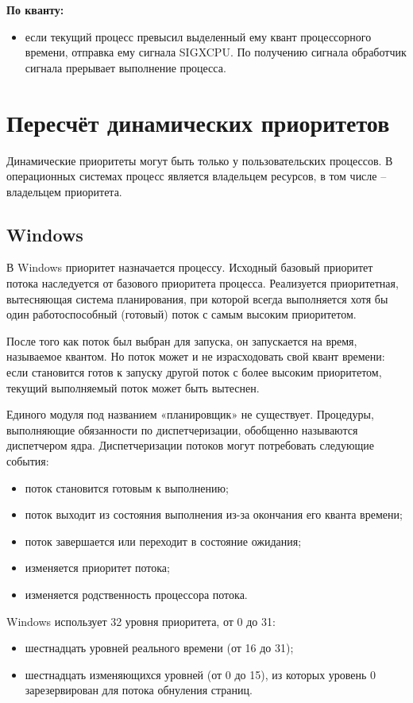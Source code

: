 \textbf{По кванту:}
\begin{itemize}[label=---]
	\item если текущий процесс превысил выделенный ему квант процессорного времени, отправка ему сигнала SIGXCPU. По получению сигнала обработчик сигнала прерывает выполнение процесса.
\end{itemize}
\pagebreak

\section{Пересчёт динамических приоритетов}

Динамические приоритеты могут быть только у пользовательских процессов. В операционных системах процесс является владельцем ресурсов, в том числе -- владельцем приоритета.

\subsection{Windows}
В Windows приоритет назначается процессу. Исходный базовый приоритет потока наследуется от базового приоритета процесса. Реализуется приоритетная, вытесняющая система планирования, при  которой всегда выполняется хотя бы один работоспособный (готовый) поток с самым высоким приоритетом.

После того как поток был выбран для запуска, он запускается на время, называемое квантом. Но поток может и не израсходовать свой квант времени: если становится готов к запуску другой поток с более высоким приоритетом, текущий выполняемый поток может быть вытеснен.

Единого модуля под названием «планировщик» не существует. Процедуры, выполняющие обязанности по диспетчеризации, обобщенно называются диспетчером ядра.   Диспетчеризации потоков могут потребовать следующие события:

\begin{itemize}[label=---]
	\item поток становится готовым к выполнению;
	\item поток выходит из состояния выполнения из-за окончания его кванта времени;
	\item поток завершается или переходит в состояние ожидания;
	\item изменяется приоритет потока;
	\item изменяется родственность процессора потока.
\end{itemize}


Windows использует 32 уровня приоритета, от 0 до 31:
\begin{itemize}[label=---]
	\item шестнадцать уровней реального времени (от 16 до 31);
	\item шестнадцать изменяющихся уровней (от 0 до 15), из которых уровень 0 зарезервирован для потока обнуления страниц. 
\end{itemize}



